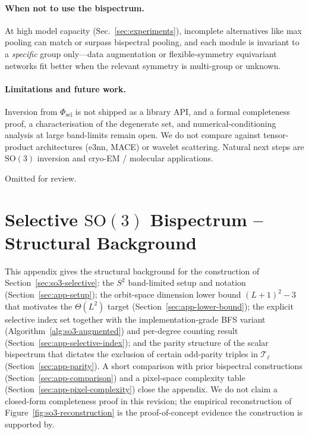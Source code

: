 \documentclass{article}
\theoremstyle{definition}
\theoremstyle{remark}
\newcommand{\SO}{\mathrm{SO}}
\theoremstyle{definition}
\begin{document}
\paragraph{When not to use the bispectrum.}
At high model capacity (Sec.~\ref{sec:experiments}), incomplete
alternatives like max pooling can match or surpass bispectral
pooling, and each module is invariant to a \emph{specific} group
only---data augmentation or flexible-symmetry equivariant networks
fit better when the relevant symmetry is multi-group or unknown.

\paragraph{Limitations and future work.}
Inversion from $\Phi_{\mathrm{sel}}$ is not shipped as a library
API, and a formal completeness proof, a characterisation of the
degenerate set, and numerical-conditioning analysis at large
band-limits remain open. We do not compare against tensor-product
architectures (e3nn, MACE) or wavelet scattering. Natural next
steps are $\SO(3)$ inversion and cryo-EM / molecular applications.

\begin{ack}
Omitted for review.
\end{ack}




\appendix

\section{Selective $\SO(3)$ Bispectrum -- Structural Background}
\label{app:so3-proof}

This appendix gives the structural background for the construction
of Section~\ref{sec:so3-selective}: the $S^2$ band-limited setup and
notation (Section~\ref{sec:app-setup}); the orbit-space dimension
lower bound $(L{+}1)^2-3$ that motivates the $\Theta(L^2)$ target
(Section~\ref{sec:app-lower-bound}); the explicit selective index set
together with the implementation-grade BFS variant
(Algorithm~\ref{alg:so3-augmented}) and per-degree counting result
(Section~\ref{sec:app-selective-index}); and the parity structure of
the scalar bispectrum that dictates the exclusion of certain
odd-parity triples in $\mathcal{T}_\ell$
(Section~\ref{sec:app-parity}). A short comparison with prior bispectral
constructions (Section~\ref{sec:app-comparison}) and a pixel-space
complexity table (Section~\ref{sec:app-pixel-complexity}) close the
appendix. We do not claim a closed-form completeness proof in this
revision; the empirical reconstruction of
Figure~\ref{fig:so3-reconstruction} is the proof-of-concept evidence
the construction is supported by.
\end{document}
